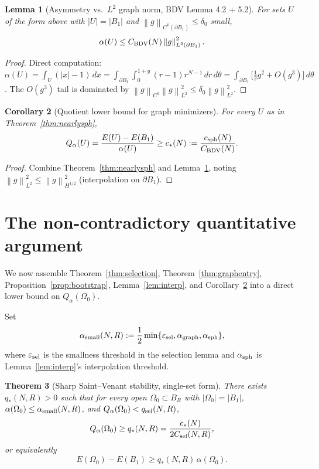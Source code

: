 \documentclass[11pt]{article}
\newtheorem{theorem}{Theorem}
\newtheorem{lemma}[theorem]{Lemma}
\newtheorem{corollary}[theorem]{Corollary}
\theoremstyle{definition}
\newcommand{\norm}[1]{\left\|#1\right\|}
\newcommand{\abs}[1]{\left|#1\right|}
\renewcommand{\d}{\,d}
\begin{document}
\begin{lemma}[Asymmetry vs.\ $L^2$ graph norm, BDV Lemma 4.2 + 5.2]\label{lem:asymL2}
For sets $U$ of the form above with $\abs U=\abs{B_1}$ and
$\norm{g}_{C^0(\partial B_1)}\le\delta_0$ small,
\[
\alpha(U)\le C_{\rm BDV}(N)\norm{g}_{L^2(\partial B_1)}^2.
\]
\end{lemma}

\begin{proof}
Direct computation: $\alpha(U)=\int_U(\abs{x}-1)\d x=
\int_{\partial B_1}\int_0^{1+g}(r-1)r^{N-1}\d r\d\theta
=\int_{\partial B_1}\bigl[\tfrac12 g^2+O(g^3)\bigr]\d\theta$.
The $O(g^3)$ tail is dominated by $\norm{g}_{C^0}\norm{g}_{L^2}^2\le\delta_0\norm{g}_{L^2}^2$.
\end{proof}

\begin{corollary}[Quotient lower bound for graph minimizers]\label{cor:Qlower}
For every $U$ as in Theorem~\ref{thm:nearlysph},
\[
Q_\alpha(U)=\frac{E(U)-E(B_1)}{\alpha(U)}\ge c_*(N):=\frac{c_{\rm sph}(N)}{C_{\rm BDV}(N)}.
\]
\end{corollary}

\begin{proof}
Combine Theorem~\ref{thm:nearlysph} and Lemma~\ref{lem:asymL2}, noting
$\norm{g}_{L^2}^2\le\norm{g}_{H^{1/2}}^2$ (interpolation on $\partial B_1$).
\end{proof}

\section{The non-contradictory quantitative argument}\label{sec:argument}

We now assemble Theorem~\ref{thm:selection}, Theorem~\ref{thm:graphentry},
Proposition~\ref{prop:bootstrap}, Lemma~\ref{lem:interp}, and
Corollary~\ref{cor:Qlower} into a direct lower bound on
$Q_\alpha(\Omega_0)$.

Set
\[
\alpha_{\rm small}(N,R):=\frac12\min\{\varepsilon_{\rm sel},\alpha_{\rm graph},
\alpha_{\rm sph}\},
\]
where $\varepsilon_{\rm sel}$ is the smallness threshold in the selection
lemma and $\alpha_{\rm sph}$ is Lemma~\ref{lem:interp}'s interpolation
threshold.

\begin{theorem}[Sharp Saint--Venant stability, single-set form]\label{thm:sv-sharp}
There exists $q_*(N,R)>0$ such that for every open
$\Omega_0\subset B_R$ with $\abs{\Omega_0}=\abs{B_1}$,
$\alpha(\Omega_0)\le \alpha_{\rm small}(N,R)$, and
$Q_\alpha(\Omega_0)<q_{\rm sel}(N,R)$,
\[
Q_\alpha(\Omega_0)\ge q_*(N,R)=\frac{c_*(N)}{2C_{\rm sel}(N,R)},
\]
or equivalently
\[
E(\Omega_0)-E(B_1)\ge q_*(N,R)\,\alpha(\Omega_0).
\]
\end{theorem}
\end{document}
